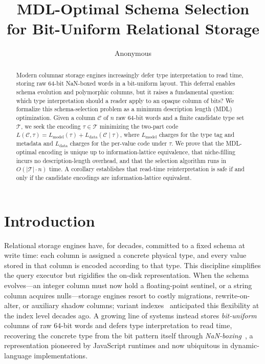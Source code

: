 \documentclass[10pt]{article}
\title{MDL-Optimal Schema Selection for Bit-Uniform Relational Storage}
\author{Anonymous}
\date{}
\theoremstyle{definition}
\theoremstyle{remark}
\newcommand{\Ccal}{\mathcal{C}}
\newcommand{\Tcal}{\mathcal{T}}
\newcommand{\Lmodel}{L_{\mathrm{model}}}
\newcommand{\Ldata}{L_{\mathrm{data}}}
\begin{document}
\maketitle

\begin{abstract}
Modern columnar storage engines increasingly defer type interpretation to
read time, storing raw $64$-bit NaN-boxed words in a bit-uniform layout.
This deferral enables schema evolution and polymorphic columns, but it
raises a fundamental question: which type interpretation should a reader
apply to an opaque column of bits? We formalize this schema-selection
problem as a minimum description length (MDL) optimization. Given a
column $\Ccal$ of $n$ raw $64$-bit words and a finite candidate type set
$\Tcal$, we seek the encoding $\tau \in \Tcal$ minimizing the two-part
code $L(\Ccal,\tau) = \Lmodel(\tau) + \Ldata(\Ccal \mid \tau)$, where
$\Lmodel$ charges for the type tag and metadata and $\Ldata$ charges for
the per-value code under $\tau$. We prove that the MDL-optimal encoding is
unique up to information-lattice equivalence, that niche-filling incurs no
description-length overhead, and that the selection algorithm runs in
$O(|\Tcal| \cdot n)$ time. A corollary establishes that read-time
reinterpretation is safe if and only if the candidate encodings are
information-lattice equivalent.
\end{abstract}

\section{Introduction}\label{sec:intro}

Relational storage engines have, for decades, committed to a fixed schema
at write time: each column is assigned a concrete physical type, and every
value stored in that column is encoded according to that type. This
discipline simplifies the query executor but rigidifies the on-disk
representation. When the schema evolves---an integer column must now hold a
floating-point sentinel, or a string column acquires nulls---storage
engines resort to costly migrations, rewrite-on-alter, or auxiliary shadow
columns; variant indexes~\citep{oneil1997} anticipated this flexibility at the index level decades ago. A growing line of systems instead stores \emph{bit-uniform}
columns of raw $64$-bit words and defers type interpretation to read time,
recovering the concrete type from the bit pattern itself through
\emph{NaN-boxing}~\citep{wingo2011}, a representation pioneered by
JavaScript runtimes and now ubiquitous in dynamic-language
implementations.
\end{document}
